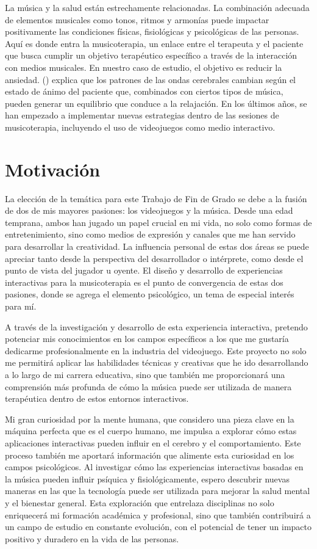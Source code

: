La música y la salud están estrechamente relacionadas. La combinación adecuada de elementos musicales como tonos, ritmos y armonías puede impactar positivamente las condiciones físicas, fisiológicas y psicológicas de las personas. Aquí es donde entra la musicoterapia, un enlace entre el terapeuta y el paciente que busca cumplir un objetivo terapéutico específico a través de la interacción con medios musicales. En nuestro caso de estudio, el objetivo es reducir la ansiedad. \citeauthor{KTN:2011} (\citeyear{KTN:2011}) explica que los patrones de las ondas cerebrales cambian según el estado de ánimo del paciente que, combinados con ciertos tipos de música, pueden generar un equilibrio que conduce a la relajación. En los últimos años, se han empezado a implementar nuevas estrategias dentro de las sesiones de musicoterapia, incluyendo el uso de videojuegos como medio interactivo.

\section{Motivación}

La elección de la temática para este Trabajo de Fin de Grado se debe a la fusión de dos de mis mayores pasiones: los videojuegos y la música. Desde una edad temprana, ambos han jugado un papel crucial en mi vida, no solo como formas de entretenimiento, sino como medios de expresión y canales que me han servido para desarrollar la creatividad. La influencia personal de estas dos áreas se puede apreciar tanto desde la perspectiva del desarrollador o intérprete, como desde el punto de vista del jugador u oyente. El diseño y desarrollo de experiencias interactivas para la musicoterapia es el punto de convergencia de estas dos pasiones, donde se agrega el elemento psicológico, un tema de especial interés para mí. 

A través de la investigación y desarrollo de esta experiencia interactiva, pretendo potenciar mis conocimientos en los campos específicos a los que me gustaría dedicarme profesionalmente en la industria del videojuego. Este proyecto no solo me permitirá aplicar las habilidades técnicas y creativas que he ido desarrollando a lo largo de mi carrera educativa, sino que también me proporcionará una comprensión más profunda de cómo la música puede ser utilizada de manera terapéutica dentro de estos entornos interactivos. 

Mi gran curiosidad por la mente humana, que considero una pieza clave en la máquina perfecta que es el cuerpo humano, me impulsa a explorar cómo estas aplicaciones interactivas pueden influir en el cerebro y el comportamiento. Este proceso también me aportará información que alimente esta curiosidad en los campos psicológicos. Al investigar cómo las experiencias interactivas basadas en la música pueden influir psíquica y fisiológicamente, espero descubrir nuevas maneras en las que la tecnología puede ser utilizada para mejorar la salud mental y el bienestar general. Esta exploración que entrelaza disciplinas no solo enriquecerá mi formación académica y profesional, sino que también contribuirá a un campo de estudio en constante evolución, con el potencial de tener un impacto positivo y duradero en la vida de las personas.

